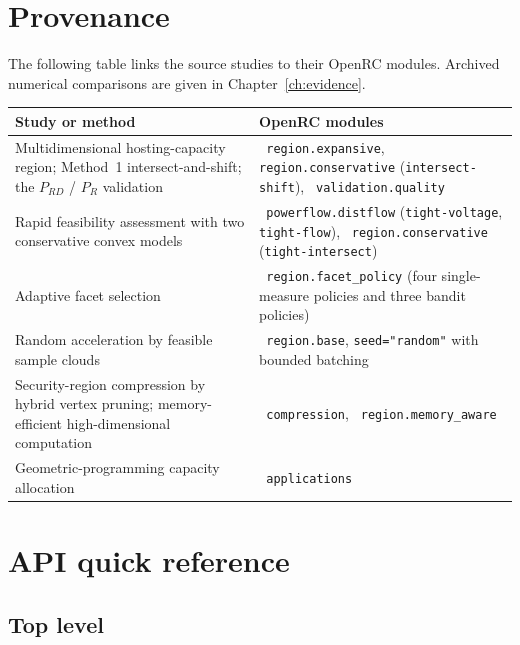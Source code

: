 \documentclass[11pt,a4paper]{report}
\newcommand{\code}[1]{\texttt{\small #1}}
\newcommand{\pymod}[1]{\texttt{\small\color{nbblue} #1}}
\begin{document}
\chapter{Provenance}
\label{ch:provenance}

The following table links the source studies to their OpenRC modules.
Archived numerical comparisons are given in Chapter~\ref{ch:evidence}.

\begin{center}\small
\begin{tabular}{@{}p{5.1cm}p{9.4cm}@{}}
\toprule
Study or method & OpenRC modules \\
\midrule
Multidimensional hosting-capacity region; Method~1 intersect-and-shift; the
$P_{RD}$ / $P_R$ validation
  & \pymod{region.expansive}, \pymod{region.conservative}
    (\code{intersect-shift}), \pymod{validation.quality} \\[2pt]
Rapid feasibility assessment with two conservative convex models
  & \pymod{powerflow.distflow} (\code{tight-voltage}, \code{tight-flow}),
    \pymod{region.conservative} (\code{tight-intersect}) \\[2pt]
Adaptive facet selection
  & \pymod{region.facet\_policy} (four single-measure policies and three bandit policies) \\[2pt]
Random acceleration by feasible sample clouds
  & \pymod{region.base}, \code{seed="random"} with bounded batching \\[2pt]
Security-region compression by hybrid vertex pruning; memory-efficient
high-dimensional computation
  & \pymod{compression}, \pymod{region.memory\_aware} \\[2pt]
Geometric-programming capacity allocation
  & \pymod{applications} \\
\bottomrule
\end{tabular}
\end{center}

\appendix
\chapter{API quick reference}
\label{app:api}

\section{Top level}
\end{document}
